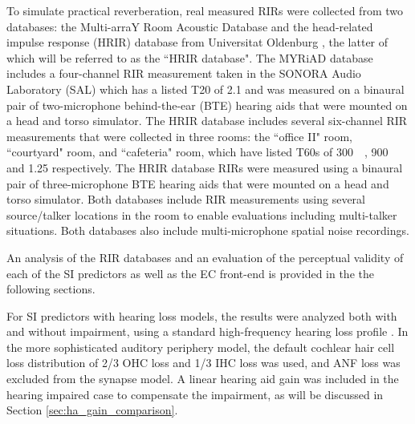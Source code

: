 To simulate practical reverberation, real measured RIRs were collected from two databases: the Multi-arraY Room Acoustic Database \citep[MYRiAD,][]{dietzen2023myriad} and the head-related impulse response (HRIR) database from Universitat Oldenburg \citep{kayser2009database}, the latter of which will be referred to as the ``HRIR database". The MYRiAD database includes a four-channel RIR measurement taken in the SONORA Audio Laboratory (SAL) which has a listed T20 of \qty{2.1}{\sec} and was measured on a binaural pair of two-microphone behind-the-ear (BTE) hearing aids that were mounted on a head and torso simulator. The HRIR database includes several six-channel RIR measurements that were collected in three rooms: the ``office II" room, ``courtyard" room, and ``cafeteria" room, which have listed T60s of \qty{300}{\milli\sec}, \qty{900}{\milli\sec} and \qty{1.25}{\sec} respectively. The HRIR database RIRs were measured using a binaural pair of three-microphone BTE hearing aids that were mounted on a head and torso simulator. Both databases include RIR measurements using several source/talker locations in the room to enable evaluations including multi-talker situations. Both databases also include multi-microphone spatial noise recordings.

An analysis of the RIR databases and an evaluation of the perceptual validity of each of the SI predictors as well as the EC front-end is provided in the the following sections.



For SI predictors with hearing loss models, the results were analyzed both with and without impairment, using a standard high-frequency hearing loss profile \citep[IEC 60118-15 moderate hearing loss, moderately sloping group, ][]{bisgaard2010standard}. In the more sophisticated \cite{bruce2018phenomenological} auditory periphery model, the default cochlear hair cell loss distribution of 2/3 OHC loss and 1/3 IHC loss was used, and ANF loss was excluded from the synapse model. A linear hearing aid gain was included in the hearing impaired case to compensate the impairment, as will be discussed in Section \ref{sec:ha_gain_comparison}.


